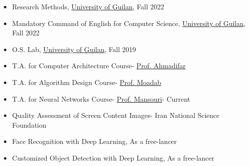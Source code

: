 \documentclass[10pt,a4paper]{altacv}
\begin{document}
	\begin{itemize}
		\item Research Methods, \href{https://guilan.ac.ir/en/home}{University of Guilan}, Fall 2022
		\item Mandatory Command of English for Computer Science, \href{https://guilan.ac.ir/en/home}{University of Guilan}, Fall 2022
		\item O.S. Lab, \href{https://guilan.ac.ir/en/home}{University of Guilan}, Fall 2019

		\item T.A. for Computer Architecture Course- \href{https://scholar.google.com/citations?user=WT1Jve8AAAAJ&hl=en}{Prof. Ahmadifar}

		\item T.A. for Algorithm Design Course- \href{https://www.linkedin.com/in/shahram-moadab-94b79253/?originalSubdomain=ir}{Prof. Moadab}

		\item T.A. for Neural Networks Course- \href{https://scholar.google.com/citations?user=eK03yPgAAAAJ}{Prof. Mansouri}- Current
	\end{itemize}
	\begin{itemize}
		\item Quality Assessment of Screen Content Images- Iran National Science Foundation

		\item Face Recognition with Deep Learning, As a free-lancer

		\item Customized Object Detection with Deep Learning, As a free-lancer
	\end{itemize}
 
\end{document}
